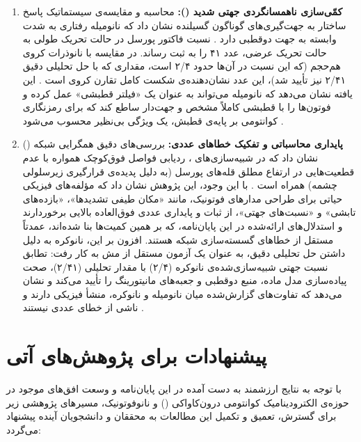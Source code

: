 \documentclass[12pt,a4paper]{report}
\begin{document}
\begin{enumerate}
\item \textbf{کمّی‌سازی ناهمسانگردی جهتی شدید ():} محاسبه و مقایسه‌ی سیستماتیک پاسخ ساختار به جهت‌گیری‌های گوناگون گسیلنده نشان داد که نانومیله رفتاری به شدت وابسته به جهت دوقطبی دارد \cite{maier,novotny}. نسبت فاکتور پورسل در حالت تحریک طولی به حالت تحریک عرضی، عدد ۴۱ را به ثبت رساند. در مقایسه با نانوذرات کروی هم‌حجم (که این نسبت در آن‌ها حدود ۲/۴ است، مقداری که با حل تحلیلی دقیق ۲/۴۱ نیز تأیید شد)، این عدد نشان‌دهنده‌ی شکست کامل تقارن کروی است \cite{maier,ruppin}. این یافته نشان می‌دهد که نانومیله می‌تواند به عنوان یک «فیلتر قطبشی» عمل کرده و فوتون‌ها را با قطبشی کاملاً مشخص و جهت‌دار ساطع کند که برای رمزنگاری کوانتومی بر پایه‌ی قطبش، یک ویژگی بی‌نظیر محسوب می‌شود \cite{novotny}.

\item \textbf{پایداری محاسباتی و تفکیک خطاهای عددی:} بررسی‌های دقیق همگرایی شبکه () نشان داد که در شبیه‌سازی‌های ، ردیابی فواصل فوق‌کوچک همواره با عدم قطعیت‌هایی در ارتفاع مطلق قله‌های پورسل (به دلیل پدیده‌ی قرارگیری زیرسلولی چشمه) همراه است \cite{taflove}. با این وجود، این پژوهش نشان داد که مؤلفه‌های فیزیکی حیاتی برای طراحی مدارهای فوتونیک، مانند «مکان طیفی تشدیدها»، «بازده‌های تابشی» و «نسبت‌های جهتی»، از ثبات و پایداری عددی فوق‌العاده بالایی برخوردارند و استدلال‌های ارائه‌شده در این پایان‌نامه، که بر همین کمیت‌ها بنا شده‌اند، عمدتاً مستقل از خطاهای گسسته‌سازی شبکه هستند. افزون بر این، نانوکره به دلیل داشتن حل تحلیلی دقیق، به عنوان یک آزمون مستقل از مش به کار رفت: تطابق نسبت جهتی شبیه‌سازی‌شده‌ی نانوکره (۲/۴) با مقدار تحلیلی (۲/۴۱)، صحت پیاده‌سازی مدل ماده، منبع دوقطبی و جعبه‌های مانیتورینگ را تأیید می‌کند و نشان می‌دهد که تفاوت‌های گزارش‌شده میان نانومیله و نانوکره، منشأ فیزیکی دارند و ناشی از خطای عددی نیستند \cite{ruppin,mertens}.
\end{enumerate}

\section{پیشنهادات برای پژوهش‌های آتی}
با توجه به نتایج ارزشمند به دست آمده در این پایان‌نامه و وسعت افق‌های موجود در حوزه‌ی الکترودینامیک کوانتومی درون‌کاواکی () و نانوفوتونیک، مسیرهای پژوهشی زیر برای گسترش، تعمیق و تکمیل این مطالعات به محققان و دانشجویان آینده پیشنهاد می‌گردد:
\end{document}
